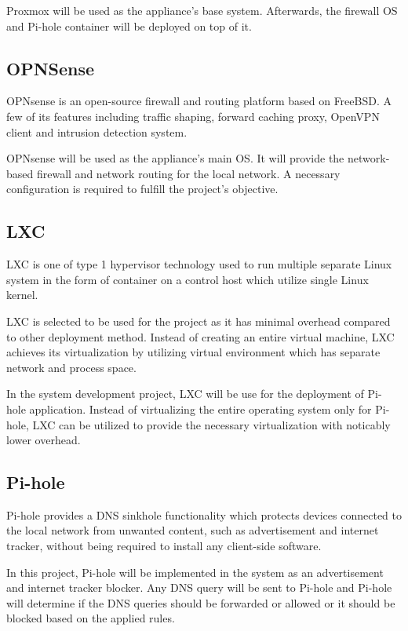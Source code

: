 \documentclass[../index.tex]{subfiles}
\begin{document}
Proxmox will be used as the appliance's base system. Afterwards, the firewall OS and Pi-hole
container will be deployed on top of it.

\subsection{OPNSense}

OPNsense is an open-source firewall and routing platform based on FreeBSD. A few of its features
including traffic shaping, forward caching proxy, OpenVPN client and intrusion detection system.

OPNsense will be used as the appliance's main OS. It will provide the network- based firewall and
network routing for the local network. A necessary configuration is required to fulfill the
project's objective.

\subsection{LXC}

LXC is one of type 1 hypervisor technology used to run multiple separate Linux system in the form of
container on a control host which utilize single Linux kernel.

LXC is selected to be used for the project as it has minimal overhead compared to other deployment
method. Instead of creating an entire virtual machine, LXC achieves its virtualization by utilizing
virtual environment which has separate network and process space.

In the system development project, LXC will be use for the deployment of Pi- hole application.
Instead of virtualizing the entire operating system only for Pi-hole, LXC can be utilized to provide
the necessary virtualization with noticably lower overhead.

\subsection{Pi-hole}

Pi-hole provides a DNS sinkhole functionality which protects devices connected to the local network
from unwanted content, such as advertisement and internet tracker, without being required to install
any client-side software.

In this project, Pi-hole will be implemented in the system as an advertisement and internet tracker
blocker. Any DNS query will be sent to Pi-hole and Pi-hole will determine if the DNS queries should
be forwarded or allowed or it should be blocked based on the applied rules.
\end{document}
